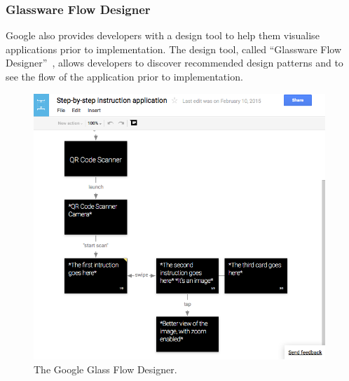 \subsubsection{Glassware Flow Designer}
Google also provides developers with a design tool to help them visualise applications prior to implementation. The design tool, called ``Glassware Flow Designer''~\cite{glasswareFlowDesigner}, allows developers to discover recommended design patterns and to see the flow of the application prior to implementation.

	\begin{figure}[ht!]
		\centering
		\includegraphics[width=110mm]{images/glaswareFlowDesignerScreenshot}
		\caption{The Google Glass Flow Designer.}
		\label{GlassDesignStyle}
	\end{figure}